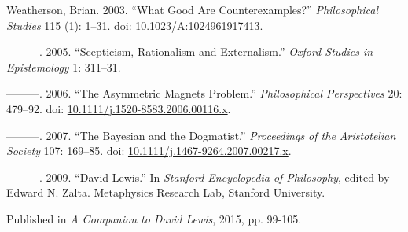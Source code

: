 \documentclass[
  11pt,
  letterpaper,
  DIV=11,
  numbers=noendperiod,
  twoside]{scrartcl}
\newlength{\cslhangindent}
\newenvironment{CSLReferences}[2] %
 {\begin{list}{}{%
  \setlength{\itemindent}{0pt}
  \setlength{\leftmargin}{0pt}
  \setlength{\parsep}{0pt}
  \ifodd #1
   \setlength{\leftmargin}{\cslhangindent}
   \setlength{\itemindent}{-1\cslhangindent}
  \fi
  \setlength{\itemsep}{#2\baselineskip}}}
 {\end{list}}
\begin{document}
\begin{CSLReferences}{1}{0}
Weatherson, Brian. 2003. {``{What Good Are Counterexamples?}''}
\emph{Philosophical Studies} 115 (1): 1--31. doi:
\href{https://doi.org/10.1023/A:1024961917413}{10.1023/A:1024961917413}.

---------. 2005. {``Scepticism, Rationalism and Externalism.''}
\emph{Oxford Studies in Epistemology} 1: 311--31.

---------. 2006. {``{The Asymmetric Magnets Problem}.''}
\emph{Philosophical Perspectives} 20: 479--92. doi:
\href{https://doi.org/10.1111/j.1520-8583.2006.00116.x}{10.1111/j.1520-8583.2006.00116.x}.

---------. 2007. {``The Bayesian and the Dogmatist.''} \emph{Proceedings
of the Aristotelian Society} 107: 169--85. doi:
\href{https://doi.org/10.1111/j.1467-9264.2007.00217.x}{10.1111/j.1467-9264.2007.00217.x}.

---------. 2009. {``{David Lewis}.''} In \emph{Stanford Encyclopedia of
Philosophy}, edited by Edward N. Zalta. Metaphysics Research Lab,
Stanford University.

\end{CSLReferences}



\noindent Published in\emph{
A Companion to David Lewis}, 2015, pp. 99-105.
\end{document}
